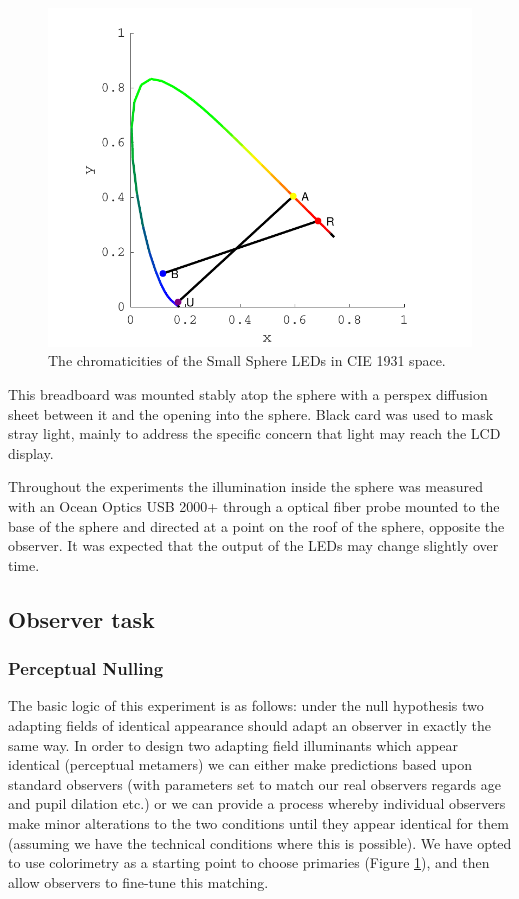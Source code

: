 \begin{figure}[htbp]
\includegraphics[max width=\textwidth,center]{figs/SmallSphere/LED_cross.pdf}
\caption{The chromaticities of the Small Sphere \glspl{LED} in CIE 1931 space.}
\label{fig:LED_cross}
\end{figure}

This breadboard was mounted stably atop the sphere with a perspex diffusion sheet between it and the opening into the sphere. Black card was used to mask stray light, mainly to address the specific concern that light may reach the LCD display.

Throughout the experiments the illumination inside the sphere was measured with an Ocean Optics USB 2000+ through a optical fiber probe mounted to the base of the sphere and directed at a point on the roof of the sphere, opposite the observer. It was expected that the output of the \glspl{LED} may change slightly over time. %


\subsection{Observer task}

\subsubsection{Perceptual Nulling}

The basic logic of this experiment is as follows: under the null hypothesis two adapting fields of identical appearance should adapt an observer in exactly the same way. In order to design two adapting field illuminants which appear identical (perceptual metamers) we can either make predictions based upon standard observers (with parameters set to match our real observers regards age and pupil dilation etc.) or we can provide a process whereby individual observers make minor alterations to the two conditions until they appear identical for them (assuming we have the technical conditions where this is possible). We have opted to use colorimetry as a starting point to choose primaries (Figure \ref{fig:LED_cross}), and then allow observers to fine-tune this matching.

